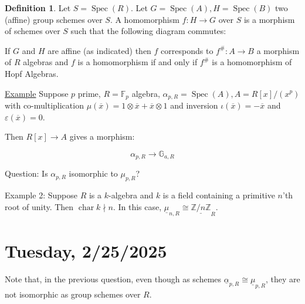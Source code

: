 \documentclass{article}
\theoremstyle{definition}
\newtheorem*{definition}{Definition}
\numberwithin{theorem}{subsection}
\begin{document}
    \begin{definition}
        Let \(S = \operatorname{Spec}(R)\). Let \(G = \operatorname{Spec}(A), H = \operatorname{Spec}(B)\) two (affine) group schemes over \(S\). A homomorphism \(f: H \to G\) over \(S\) is a morphism of schemes over \(S\) such that the following diagram commutes:

        \begin{center}
        \end{center}

        If \(G\) and \(H\) are affine (as indicated) then \(f\) corresponds to \(f^\#: A \to B\) a morphism of \(R\) algebras and \(f\) is a homomorphism if and only if \(f^\#\) is a homomorphism of Hopf Algebras. 
    \end{definition}

    \underline{Example} Suppose \(p\) prime, \(R = \mathbb{F}_p\) algebra, \(\alpha_{p,R} = \operatorname{Spec}(A), A = R[x] / (x^p)\) with co-multiplication \(\mu(\overline{x}) = 1 \otimes \overline{x} + \overline{x} \otimes 1\) and inversion \(\iota(\overline{x}) = - \overline{x}\) and \(\varepsilon(\overline{x}) = 0\).
    
    Then \(R[x] \to A\) gives a morphism:

    \[
        \alpha_{p,R} \to \mathbb{G}_{a,R}
    \]

    Question: Is \(\alpha_{p,R}\) isomorphic to \(\mu_{p,R}\)?

    Example 2: Suppose \(R\) is a \(k\)-algebra and \(k\) is a field containing a primitive \(n\)'th root of unity. Then \(\operatorname{char} k \nmid n\). In this case, \(\underline{\mu}_{n,R} \cong \underline{\mathbb{Z} / n\mathbb{Z}}_R\). 

    \section*{Tuesday, 2/25/2025}
    
    Note that, in the previous question, even though as schemes \(\underline{\alpha}_{p,R} \cong \underline{\mu}_{p,R}\), they are not isomorphic as group schemes over \(R\).
\end{document}
